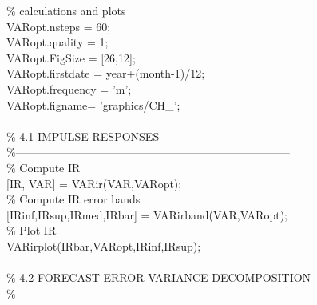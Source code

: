 \hspace{1mm}\textcolor{matlabgreen}{\% calculations and plots }\\ 
\hspace{1mm}VARopt.nsteps = 60; \\ 
\hspace{1mm}VARopt.quality = 1; \\ 
\hspace{1mm}VARopt.FigSize = [26,12]; \\ 
\hspace{1mm}VARopt.firstdate = year+(month-1)/12; \\ 
\hspace{1mm}VARopt.frequency = \textcolor{matlabpurple}{'m'}; \\ 
\hspace{1mm}VARopt.figname= \textcolor{matlabpurple}{'graphics/CH\_'}; \\ 
\hspace{1mm} \\ 
\hspace{1mm}\textcolor{matlabgreen}{\% 4.1 IMPULSE RESPONSES }\\ 
\hspace{1mm}\textcolor{matlabgreen}{\%--------------------------------------------------------------------------  }\\ 
\hspace{1mm}\textcolor{matlabgreen}{\% Compute IR }\\ 
\hspace{1mm}[IR, VAR] = VARir(VAR,VARopt); \\ 
\hspace{1mm}\textcolor{matlabgreen}{\% Compute IR error bands }\\ 
\hspace{1mm}[IRinf,IRsup,IRmed,IRbar] = VARirband(VAR,VARopt); \\ 
\hspace{1mm}\textcolor{matlabgreen}{\% Plot IR }\\ 
\hspace{1mm}VARirplot(IRbar,VARopt,IRinf,IRsup); \\ 
\hspace{1mm} \\ 
\hspace{1mm}\textcolor{matlabgreen}{\% 4.2 FORECAST ERROR VARIANCE DECOMPOSITION }\\ 
\hspace{1mm}\textcolor{matlabgreen}{\%--------------------------------------------------------------------------  }\\ 
